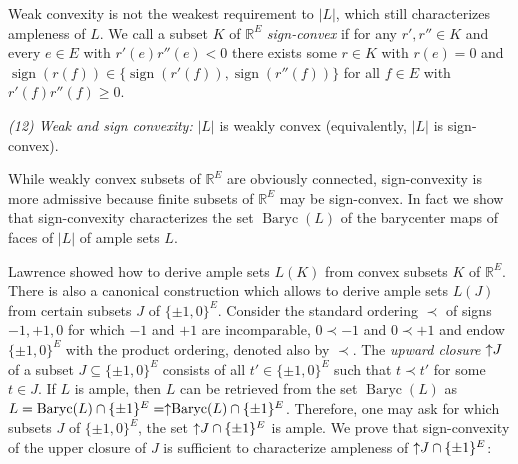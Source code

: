 \documentclass[11pt,a4paper]{amsart}
\theoremstyle{definition}
\numberwithin{equation}{section}
\DeclareMathOperator{\sign}{sign}
\DeclareMathOperator{\Baryc}{Baryc}
\newcommand{\covectors}{\ensuremath{L}}
\newcommand{\hcovectors}{J}
\begin{document}
Weak convexity is not the weakest requirement to $|\covectors|$, which still characterizes ampleness of $\covectors$. We call a subset $K$ of ${\mathbb R}^E$ \emph{sign-convex} if for any  $r',r''\in K$ and every $e\in E$ with $r'(e)r''(e)<0$ there exists some  $r\in K$ with $r(e)=0$ and $\sign(r(f))\in \{ \sign(r'(f)),\sign(r''(f))\}$ for all $f\in E$ with $r'(f)r''(f)\ge 0$.  %

\medskip\noindent
{\it {\rm(12)} Weak  and sign convexity:}  $\vert {\covectors}\vert$ is
weakly convex (equivalently, $\vert {\covectors}\vert$ is sign-convex).

\medskip
While weakly convex subsets of  ${\mathbb R}^E$ are obviously connected, sign-convexity is more admissive  because finite subsets of  ${\mathbb R}^E$  may be sign-convex. In fact we show that sign-convexity characterizes the set $\Baryc(\covectors)$ of  the barycenter maps of faces of $|\covectors|$ of ample sets $\covectors$. %


Lawrence \cite{La} showed how to derive ample sets $\covectors(K)$ from convex subsets $K$ of ${\mathbb R}^E$. There is also a
canonical construction which allows to derive ample sets $\covectors(\hcovectors)$ from certain subsets $\hcovectors$ of $\{ \pm 1, 0\}^E$. Consider the standard ordering $\prec$ of signs $-1,+1,0$ for which $-1$ and $+1$
are incomparable, $0\prec -1$ and $0\prec +1$ and endow $\{ \pm 1,0\}^E$ with the product ordering, denoted also by $\prec$. The {\it upward  closure} $\uparrow\hspace*{-0.1cm}\hcovectors$ of a subset $\hcovectors\subseteq \{ \pm 1,0\}^E$ consists of all $t'\in \{ \pm 1,0\}^E$ such that $t\prec t'$ for some $t\in \hcovectors$.  %
If $\covectors$ is ample, then $\covectors$ can be retrieved from the set $\Baryc(\covectors)$ as $\covectors=\Baryc(\covectors)\cap \{ \pm 1\}^E=\uparrow\hspace*{-0.1cm}\Baryc(\covectors)\cap \{ \pm 1\}^E$.  Therefore, one may ask for which subsets $\hcovectors$ of $\{ \pm 1, 0\}^E$, the set $\uparrow\hspace*{-0.1cm}\hcovectors\cap \{ \pm 1\}^E$ is ample. We prove that sign-convexity of  the upper closure of $\hcovectors$ is sufficient to characterize  ampleness of $\uparrow\hspace*{-0.1cm}\hcovectors\cap \{ \pm 1\}^E$:
\end{document}
